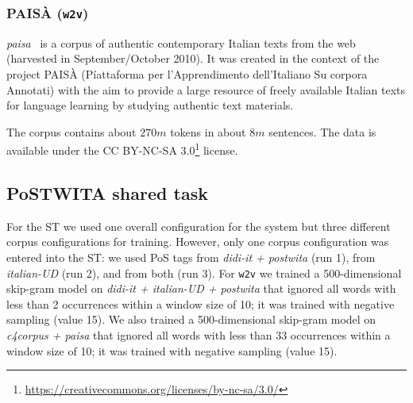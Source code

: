 \documentclass[11pt]{article}
\newcommand\wtv{\texttt{w2v}\xspace}
\begin{document}
\subsubsection{PAIS{\`A} (\wtv)} %
\emph{paisa}~\cite{paisa2014} is a corpus of authentic contemporary Italian
texts from the web (harvested in September/October 2010).
It was created in the context of the project PAIS{\`A} (P{\'i}attaforma per
l'Apprendimento dell'Italiano Su corpora Annotati) with the aim to provide a
large resource of freely available Italian texts for language learning by
studying authentic text materials.

The corpus contains about $270m$ tokens in about $8m$ sentences. 
The data is available under the CC BY-NC-SA
3.0\footnote{\url{https://creativecommons.org/licenses/by-nc-sa/3.0/}} license. 





\subsection{PoSTWITA shared task} %
\label{ssec:postwita}

For the ST we used one overall configuration for the system but three different
corpus configurations for training.
However, only one corpus configuration was entered into the ST: we used PoS
tags from \emph{didi-it + postwita} (run 1), from \emph{italian-UD} (run 2),
and from both (run 3).
For \wtv we trained a 500-dimensional skip-gram model on \emph{didi-it +
italian-UD + postwita} that ignored all words with less than 2 occurrences
within a window size of 10; it was trained with negative sampling (value 15).
We also trained a 500-dimensional skip-gram model on \emph{c4corpus + paisa}
that ignored all words with less than 33 occurrences within a window size of
10; it was trained with negative sampling (value 15).
\end{document}
